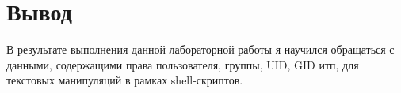 \section{Вывод}
В результате выполнения данной лабораторной работы я научился обращаться с данными, содержащими права пользователя, группы, UID, GID итп, для текстовых манипуляций в рамках shell-скриптов.
